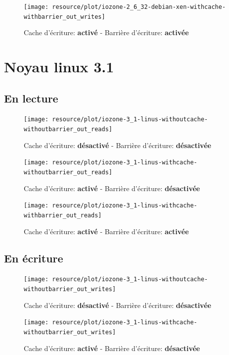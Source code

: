 \begin{figure}[H]
	\centering
	\texttt{[image: resource/plot/iozone-2\_6\_32-debian-xen-withcache-withbarrier\_out\_writes]}
	\caption{Cache d'écriture: \textbf{activé}   -   Barrière d'écriture: \textbf{activée}}
\end{figure}

\section{Noyau linux 3.1}

\subsection*{En lecture}

\begin{figure}[H]
	\centering
	\texttt{[image: resource/plot/iozone-3\_1-linus-withoutcache-withoutbarrier\_out\_reads]}
	\caption{Cache d'écriture: \textbf{désactivé}   -   Barrière d'écriture: \textbf{désactivée}}
\end{figure}

\begin{figure}[H]
	\centering
	\texttt{[image: resource/plot/iozone-3\_1-linus-withcache-withoutbarrier\_out\_reads]}
	\caption{Cache d'écriture: \textbf{activé}   -   Barrière d'écriture: \textbf{désactivée}}
\end{figure}

\begin{figure}[H]
	\centering
	\texttt{[image: resource/plot/iozone-3\_1-linus-withcache-withbarrier\_out\_reads]}
	\caption{Cache d'écriture: \textbf{activé}   -   Barrière d'écriture: \textbf{activée}}
\end{figure}

\subsection*{En écriture}

\begin{figure}[H]
	\centering
	\texttt{[image: resource/plot/iozone-3\_1-linus-withoutcache-withoutbarrier\_out\_writes]}
	\caption{Cache d'écriture: \textbf{désactivé}   -   Barrière d'écriture: \textbf{désactivée}}
\end{figure}

\begin{figure}[H]
	\centering
	\texttt{[image: resource/plot/iozone-3\_1-linus-withcache-withoutbarrier\_out\_writes]}
	\caption{Cache d'écriture: \textbf{activé}   -   Barrière d'écriture: \textbf{désactivée}}
\end{figure}

